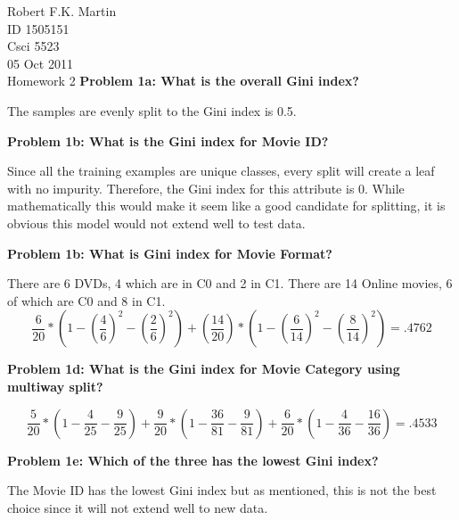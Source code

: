 \documentclass[11pt]{article}
\numberwithin{equation}{section}  %
\begin{document}


\noindent Robert F.K. Martin\\
ID 1505151\\
Csci 5523\\
05 Oct 2011\\
Homework 2
\hline
\vspace*{0.25in}
\noindent\textbf{Problem 1a: What is the overall Gini index?}
\vspace*{0.25in}

\noindent The samples are evenly split to the Gini index is 0.5.
\vspace*{0.25in}

\noindent\textbf{Problem 1b: What is the Gini index for Movie ID?}
\vspace*{0.25in}

\noindent Since all the training examples are unique classes, every split will create a leaf with no impurity. Therefore, the Gini index for this attribute is 0. While mathematically this would make it seem like a good candidate for splitting, it is obvious this model would not extend well to test data.
\vspace*{0.25in}

\noindent\textbf{Problem 1b: What is Gini index for Movie Format?}
\vspace*{0.25in}

\noindent There are 6 DVDs, 4 which are in C0 and 2 in C1. There are 14 Online movies, 6 of which are C0 and 8 in C1.
$$ \frac{6}{20} * \left(1-\left(\frac{4}{6}\right)^2-\left(\frac{2}{6}\right)^2\right)+\left(\frac{14}{20}\right)*\left(1-\left(\frac{6}{14}\right)^2-\left(\frac{8}{14}\right)^2\right)=.4762 $$
\vspace*{0.25in}

\noindent\textbf{Problem 1d: What is the Gini index for Movie Category using multiway split?}
\vspace*{0.25in}

$$ \frac{5}{20} * \left(1-\frac{4}{25} - \frac{9}{25}\right)+ \frac{9}{20} *\left(1- \frac{36}{81} - \frac{9}{81}\right)+ \frac{6}{20} *\left(1- \frac{4}{36} - \frac{16}{36}\right)=.4533$$
\vspace*{0.25in}

\noindent\textbf{Problem 1e: Which of the three has the lowest Gini index?}
\vspace*{0.25in}

\noindent The Movie ID has the lowest Gini index but as mentioned, this is not the best choice since it will not extend well to new data.
\vspace*{0.25in}
\end{document}
